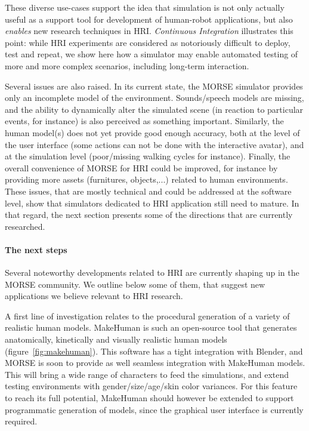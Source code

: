 \documentclass[letterpaper, 10pt, conference]{ieeeconf}
\begin{document}
These diverse use-cases support the idea that simulation is not only actually
useful as a support tool for development of human-robot applications, but also
\emph{enables} new research techniques in HRI. \emph{Continuous Integration}
illustrates this point: while HRI experiments are considered as notoriously
difficult to deploy, test and repeat, we show here how a simulator may enable
automated testing of more and more complex scenarios, including long-term
interaction.

Several issues are also raised. In its current state, the MORSE simulator
provides only an incomplete model of the environment. Sounds/speech models are
missing, and the ability to dynamically alter the simulated scene (in reaction
to particular events, for instance) is also perceived as something important.
Similarly, the human model(s) does not yet provide good enough accuracy, both at
the level of the user interface (some actions can not be done with the
interactive avatar), and at the simulation level (poor/missing walking cycles
for instance). Finally, the overall convenience of MORSE for HRI could be
improved, for instance by providing more assets (furnitures, objects,...)
related to human environments.  These issues, that are mostly technical and
could be addressed at the software level, show that simulators dedicated to HRI
application still need to mature.  In that regard, the next section presents
some of the directions that are currently researched.

\paragraph*{The next steps}

Several noteworthy developments related to HRI are currently shaping up in the
MORSE community. We outline below some of them, that suggest new applications we
believe relevant to HRI research.

A first line of investigation relates to the procedural generation of a variety
of realistic human models. {\sc MakeHuman} is such an open-source tool that
generates anatomically, kinetically and visually realistic human models
(figure~\ref{fig:makehuman}). This software has a tight integration with Blender,
and MORSE is soon to provide as well seamless integration with {\sc MakeHuman}
models. This will bring a wide range of characters to feed the simulations,
and extend testing environments with gender/size/age/skin color variances.  For
this feature to reach its full potential, {\sc MakeHuman} should however be
extended to support programmatic generation of models, since the graphical user
interface is currently required.
\end{document}
